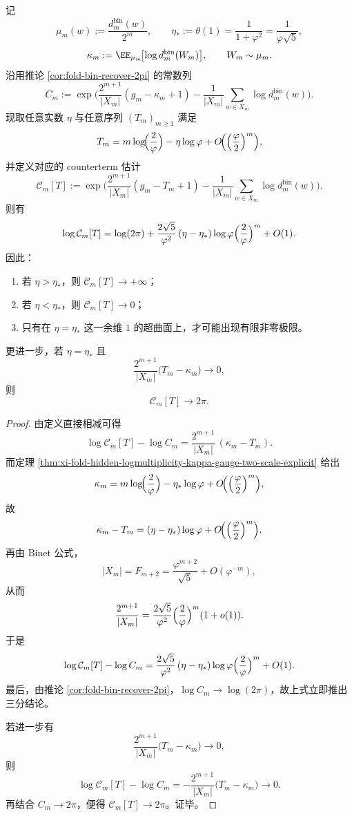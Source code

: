 \begin{theorem}\label{thm:conclusion-pi-endogenous-recovery-codimone-counterterm}
记
\[
\mu_m(w):=\frac{d_m^{\mathrm{bin}}(w)}{2^m},
\qquad
\eta_*:=\theta(1)=\frac{1}{1+\varphi^2}=\frac{1}{\varphi\sqrt5},
\]
\[
\kappa_m:=\EE_{\mu_m}\!\bigl[\log d_m^{\mathrm{bin}}(W_m)\bigr],
\qquad
W_m\sim \mu_m.
\]
沿用推论 \ref{cor:fold-bin-recover-2pi} 的常数列
\[
C_m
:=
\exp\!\Biggl(
\frac{2^{m+1}}{|X_m|}(g_m-\kappa_m+1)
-\frac{1}{|X_m|}\sum_{w\in X_m}\log d_m^{\mathrm{bin}}(w)
\Biggr).
\]
现取任意实数 \(\eta\) 与任意序列 \((T_m)_{m\ge 1}\) 满足
\[
T_m
=
m\log\!\Bigl(\frac{2}{\varphi}\Bigr)-\eta\log\varphi
+O\!\Bigl(\Bigl(\frac{\varphi}{2}\Bigr)^m\Bigr),
\]
并定义对应的 counterterm 估计
\[
\mathcal C_m[T]
:=
\exp\!\Biggl(
\frac{2^{m+1}}{|X_m|}(g_m-T_m+1)
-\frac{1}{|X_m|}\sum_{w\in X_m}\log d_m^{\mathrm{bin}}(w)
\Biggr).
\]
则有
\[
\log \mathcal C_m[T]
=
\log(2\pi)
+
\frac{2\sqrt5}{\varphi^2}\,(\eta-\eta_*)\log\varphi
\Bigl(\frac{2}{\varphi}\Bigr)^m
+O(1).
\]
因此：
\begin{enumerate}
  \item 若 \(\eta>\eta_*\)，则 \(\mathcal C_m[T]\to+\infty\)；
  \item 若 \(\eta<\eta_*\)，则 \(\mathcal C_m[T]\to 0\)；
  \item 只有在 \(\eta=\eta_*\) 这一余维 \(1\) 的超曲面上，才可能出现有限非零极限。
\end{enumerate}
更进一步，若 \(\eta=\eta_*\) 且
\[
\frac{2^{m+1}}{|X_m|}\bigl(T_m-\kappa_m\bigr)\to 0,
\]
则
\[
\mathcal C_m[T]\to 2\pi.
\]
\end{theorem}
\begin{proof}
由定义直接相减可得
\[
\log \mathcal C_m[T]-\log C_m
=
\frac{2^{m+1}}{|X_m|}\,(\kappa_m-T_m).
\]
而定理 \ref{thm:xi-fold-hidden-logmultiplicity-kappa-gauge-two-scale-explicit} 给出
\[
\kappa_m
=
m\log\!\Bigl(\frac{2}{\varphi}\Bigr)-\eta_*\log\varphi
+O\!\Bigl(\Bigl(\frac{\varphi}{2}\Bigr)^m\Bigr),
\]
故
\[
\kappa_m-T_m
=
(\eta-\eta_*)\log\varphi
+O\!\Bigl(\Bigl(\frac{\varphi}{2}\Bigr)^m\Bigr).
\]
再由 Binet 公式，
\[
|X_m|=F_{m+2}
=
\frac{\varphi^{m+2}}{\sqrt5}+O(\varphi^{-m}),
\]
从而
\[
\frac{2^{m+1}}{|X_m|}
=
\frac{2\sqrt5}{\varphi^2}
\Bigl(\frac{2}{\varphi}\Bigr)^m(1+o(1)).
\]
于是
\[
\log \mathcal C_m[T]-\log C_m
=
\frac{2\sqrt5}{\varphi^2}\,(\eta-\eta_*)\log\varphi
\Bigl(\frac{2}{\varphi}\Bigr)^m
+O(1).
\]
最后，由推论 \ref{cor:fold-bin-recover-2pi}，\(\log C_m\to\log(2\pi)\)，故上式立即推出三分结论。

若进一步有
\[
\frac{2^{m+1}}{|X_m|}\bigl(T_m-\kappa_m\bigr)\to 0,
\]
则
\[
\log \mathcal C_m[T]-\log C_m
=
-\frac{2^{m+1}}{|X_m|}\bigl(T_m-\kappa_m\bigr)\to 0.
\]
再结合 \(C_m\to 2\pi\)，便得 \(\mathcal C_m[T]\to 2\pi\)。证毕。
\end{proof}

